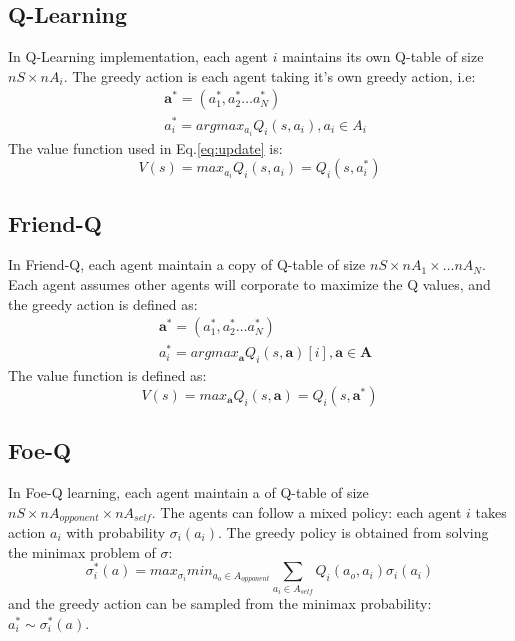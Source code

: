 \documentclass[conference]{IEEEtran}
\begin{document}
\subsection{Q-Learning}
In Q-Learning implementation, each agent $i$ maintains its own Q-table of size $nS\times nA_i$. The greedy action is each agent taking it's own greedy action, i.e:
\begin{align*}
& \mathbf{a^*} = (a_1^*, a_2^* \dots a_N^*) \\
& a_i^* = argmax_{a_i} Q_i(s, a_i), a_i \in A_i
\end{align*}
The value function used in Eq.\ref{eq:update} is:
\begin{equation}
V(s) = max_{a_i} Q_i(s, a_i) = Q_i(s, a_i^*)
\end{equation}

\subsection{Friend-Q}
In Friend-Q, each agent maintain a copy of Q-table of size $nS\times nA_1 \times\dots nA_N$. Each agent assumes other agents will corporate to maximize the Q values, and the greedy action is defined as:
\begin{align*}
& \mathbf{a^*} = (a_1^*, a_2^* \dots a_N^*) \\
& a_i^* = argmax_{\mathbf{a}} Q_i(s, \mathbf{a})[i], \mathbf{a} \in \mathbf{A}
\end{align*}
The value function is defined as:
\begin{equation}
V(s) = max_{\mathbf{a} } Q_i(s,  \mathbf{a})  = Q_i(s, \mathbf{a^*})
\end{equation}

\subsection{Foe-Q}
In Foe-Q learning, each agent maintain a of Q-table of size $nS \times nA_{opponent} \times nA_{self}$. The agents can follow a mixed policy: each agent $i$ takes action $a_i$ with probability $\sigma_i(a_i)$. The greedy policy is obtained from solving the minimax problem of $\sigma$:
\begin{equation}
\sigma_i^*(a) = max_{\sigma_i} min_{a_o\in A_{opponent}} \sum_{a_i\in A_{self}}Q_i(a_o, a_i) \sigma_i(a_i)
\end{equation}
and the greedy action can be sampled from the minimax probability: $a_i^* \sim \sigma_i^*(a)$.
\end{document}
